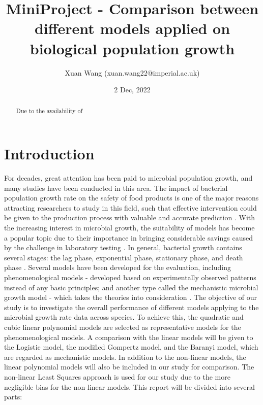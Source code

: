 \documentclass[11pt, oneside]{article}
\title{MiniProject - Comparison between different models applied on biological population growth}
\author{Xuan Wang (xuan.wang22@imperial.ac.uk)}
\date{2 Dec, 2022}
\begin{document}
\nocite{*}
	\maketitle
	\newpage

	\begin{abstract}
	Due to the availability of 
	\end{abstract}
	\pagebreak

	\section{Introduction}

	For decades, great attention has been paid to microbial population growth, and many studies have been conducted in this area. The impact of bacterial population growth rate on the safety of food products is one of the major reasons attracting researchers to study in this field, such that effective intervention could be given to the production process with valuable and accurate prediction \cite{Nauta}. With the increasing interest in microbial growth, the suitability of models has become a popular topic due to their importance in bringing considerable savings caused by the challenge in laboratory testing \cite{perni2005estimating}. 
	\bigbreak
	\noindent In general, bacterial growth contains several stages: the lag phase, exponential phase, stationary phase, and death phase \cite{doi:10.1080/10408398.2011.570463}. Several models have been developed for the evaluation, including phenomenological models - developed based on experimentally observed patterns instead of any basic principles; and another type called the mechanistic microbial growth model - which takes the theories into consideration \cite{doi:10.1080/10408398.2011.570463}. The objective of our study is to investigate the overall performance of different models applying to the microbial growth rate data across species. To achieve this, the quadratic and cubic linear polynomial models are selected as representative models for the phenomenological models. A comparison with the linear models will be given to the Logistic model, the modified Gompertz model, and the Baranyi model, which are regarded as mechanistic models. In addition to the non-linear models, the linear polynomial models will also be included in our study for comparison. The non-linear Least Squares approach is used for our study due to the more negligible bias for the non-linear models. 
	\bigbreak
	\noindent This report will be divided into several parts:
\end{document}
